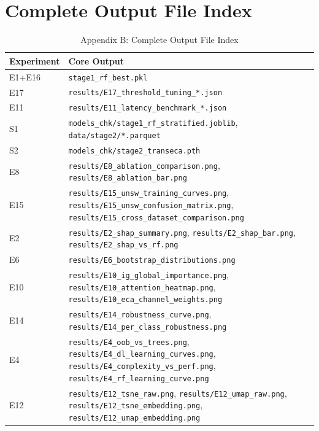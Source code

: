 \documentclass[sigconf]{acmart}
\begin{document}
\section{Complete Output File Index}

\begin{table}[H]
\caption{Appendix B: Complete Output File Index}
\label{tab:output_index}
\begin{tabular}{ll}
\toprule
\textbf{Experiment} & \textbf{Core Output} \\
\midrule
E1+E16 & \texttt{stage1\_rf\_best.pkl} \\
E17 & \texttt{results/E17\_threshold\_tuning\_*.json} \\
E11 & \texttt{results/E11\_latency\_benchmark\_*.json} \\
S1 & \texttt{models\_chk/stage1\_rf\_stratified.joblib}, \texttt{data/stage2/*.parquet} \\
S2 & \texttt{models\_chk/stage2\_transeca.pth} \\
E8 & \texttt{results/E8\_ablation\_comparison.png}, \texttt{results/E8\_ablation\_bar.png} \\
E15 & \texttt{results/E15\_unsw\_training\_curves.png}, \texttt{results/E15\_unsw\_confusion\_matrix.png}, \texttt{results/E15\_cross\_dataset\_comparison.png} \\
E2 & \texttt{results/E2\_shap\_summary.png}, \texttt{results/E2\_shap\_bar.png}, \texttt{results/E2\_shap\_vs\_rf.png} \\
E6 & \texttt{results/E6\_bootstrap\_distributions.png} \\
E10 & \texttt{results/E10\_ig\_global\_importance.png}, \texttt{results/E10\_attention\_heatmap.png}, \texttt{results/E10\_eca\_channel\_weights.png} \\
E14 & \texttt{results/E14\_robustness\_curve.png}, \texttt{results/E14\_per\_class\_robustness.png} \\
E4 & \texttt{results/E4\_oob\_vs\_trees.png}, \texttt{results/E4\_dl\_learning\_curves.png}, \texttt{results/E4\_complexity\_vs\_perf.png}, \texttt{results/E4\_rf\_learning\_curve.png} \\
E12 & \texttt{results/E12\_tsne\_raw.png}, \texttt{results/E12\_umap\_raw.png}, \texttt{results/E12\_tsne\_embedding.png}, \texttt{results/E12\_umap\_embedding.png} \\
\bottomrule
\end{tabular}
\end{table}
\end{document}
